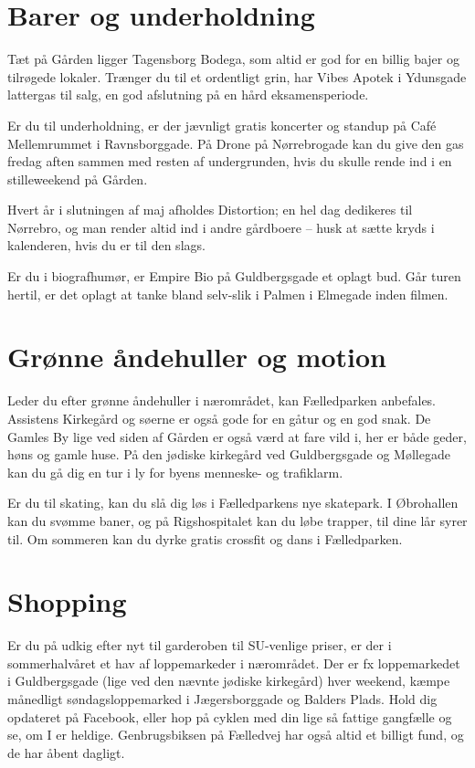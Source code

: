 \documentclass[11pt,article,twoside,openany,danish,extrafontsizes]{memoir} %
\begin{document}
\section{Barer og underholdning}
Tæt på Gården ligger Tagensborg Bodega, som altid er god for en billig bajer og tilrøgede lokaler. Trænger du til et ordentligt grin, har Vibes Apotek i Ydunsgade lattergas til salg, en god afslutning på en hård eksamensperiode.

Er du til underholdning, er der jævnligt gratis koncerter og standup på Café Mellemrummet i Ravnsborggade. På Drone på Nørrebrogade kan du give den gas fredag aften sammen med resten af undergrunden, hvis du skulle rende ind i en stilleweekend på Gården.

Hvert år i slutningen af maj afholdes Distortion; en hel dag dedikeres til Nørrebro, og man render altid ind i andre gårdboere -- husk at sætte kryds i kalenderen, hvis du er til den slags.

Er du i biografhumør, er Empire Bio på Guldbergsgade et oplagt bud. Går turen hertil, er det oplagt at tanke bland selv-slik i Palmen i Elmegade inden filmen.



\section{Grønne åndehuller og motion}
Leder du efter grønne åndehuller i nærområdet, kan Fælledparken anbefales. Assistens Kirkegård og søerne er også gode for en gåtur og en god snak. De Gamles By lige ved siden af Gården er også værd at fare vild i, her er både geder, høns og gamle huse.
På den jødiske kirkegård ved Guldbergsgade og Møllegade kan du gå dig en tur i ly for byens menneske- og trafiklarm.

Er du til skating, kan du slå dig løs i Fælledparkens nye skatepark. I Øbrohallen kan du svømme baner, og på Rigshospitalet kan du løbe trapper, til dine lår syrer til. Om sommeren kan du dyrke gratis crossfit og dans i Fælledparken.

\section{Shopping}
Er du på udkig efter nyt til garderoben til SU-venlige priser, er der i sommerhalvåret et hav af loppemarkeder i nærområdet. Der er fx loppemarkedet i Guldbergsgade (lige ved den nævnte jødiske kirkegård) hver week\-end, kæmpe månedligt søndagsloppemarked i Jægersborggade og Balders Plads. Hold dig opdateret på Facebook, eller hop på cyklen med din lige så fattige gangfælle og se, om I er heldige. Genbrugsbiksen på Fælledvej har også altid et billigt fund, og de har åbent dagligt.
\end{document}

